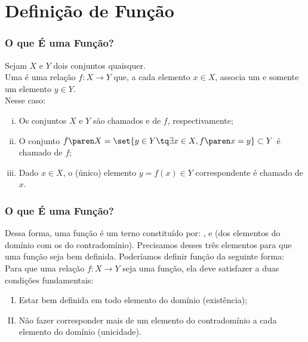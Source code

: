\documentclass[brazil, notheorems, 10pt]{beamer}
\begin{document}
\section{Definição de Função}
\begin{frame} \frametitle{O que É uma Função?}
\begin{Def}
Sejam $X$ e $Y$ dois conjuntos quaisquer.\\
Uma  é uma relação $f: X \to Y$ que, a cada elemento $x
\in X$, associa um e somente um elemento $y \in Y$.\\
Nesse caso:
\begin{enumerate}[(i)]
	\item Os conjuntos $X$ e $Y$ são chamados  e
	 de $f$, respectivamente;
	\item O conjunto $f\paren X = \set{y \in Y \tq \exists x \in X , f \paren x =
	y} \subset Y$ é chamado  de $f$;
	\item Dado $x \in X$, o (único) elemento $y = f(x) \in Y$
	correspondente é chamado  de $x$.
\end{enumerate}
\end{Def}

\end{frame}


\begin{frame} \frametitle{O que É uma Função?} %

Dessa forma, uma função é um terno constituído por: ,
 e  (dos elementos do
domínio com os do contradomínio). Precisamos desses três elementos
para que uma função seja bem definida. Poderíamos definir
função da seguinte forma: \\
Para que uma relação $f: X \to Y$ seja
uma função, ela deve satisfazer a duas condições fundamentais:
\begin{enumerate}[(I)]
	\item Estar bem definida em todo elemento do domínio (existência);
	\item Não fazer corresponder mais de um elemento do contradomínio
	a cada elemento do domínio (unicidade).
\end{enumerate}

\end{frame}

\end{document}
